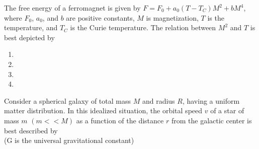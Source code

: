 \item The free energy of a ferromagnet is given by $F=F_0+a_0(T-T_C)M^2+bM^4$, where $F_0$, $a_0$, and $b$ are positive constants, $M$ is magnetization, $T$ is the temperature, and $T_C$ is the Curie temperature. The relation between $M^2$ and $T$ is best depicted by

\begin{enumerate}
\item {}
\item {}
\item {}
\item {}
\end{enumerate}

\item Consider a spherical galaxy of total mass $M$ and radius $R$, having a uniform matter distribution. In this idealized situation, the orbital speed $v$ of a star of mass $m$ $(m<<M)$ as a function of the distance $r$ from the galactic center is best described by \\ (G is the universal gravitational constant)

